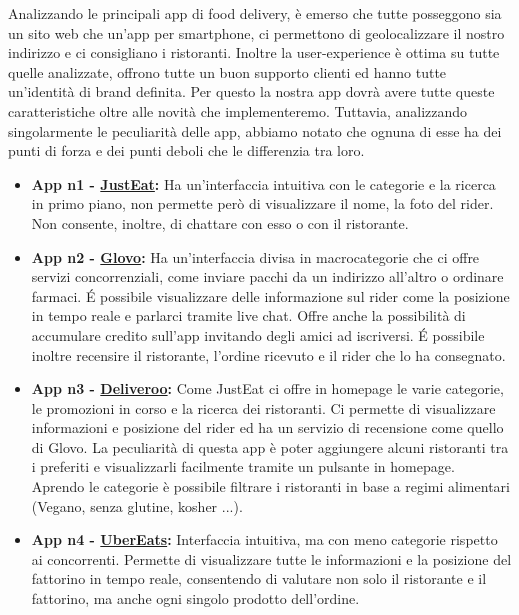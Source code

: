 \documentclass{article}
\begin{document}
     \par
    \newpage
    \vspace{0.5cm}
    Analizzando le principali app di food delivery, è emerso che tutte posseggono sia un sito web che un'app per smartphone, ci permettono di geolocalizzare il nostro indirizzo e ci consigliano i ristoranti. Inoltre la user-experience è ottima su tutte quelle analizzate, offrono tutte un buon supporto clienti ed hanno tutte un'identità di brand definita. Per questo la nostra app dovrà avere tutte queste caratteristiche oltre alle novità che implementeremo. Tuttavia, analizzando singolarmente le peculiarità delle app, abbiamo notato che ognuna di esse ha dei punti di forza e dei punti deboli che le differenzia tra loro.\vspace{0,7cm}
\begin{itemize}
        \item \textbf{App n1 - \href{https://www.justeat.it}{JustEat}:} Ha un’interfaccia intuitiva con le categorie e la ricerca in primo piano, non permette però di visualizzare il nome, la foto del rider. Non consente, inoltre, di chattare con esso o con il ristorante.\vspace{0.3cm}

        \item \textbf{App n2 - \href{https://glovoapp.com/it/it/}{Glovo}:} Ha un'interfaccia divisa in macrocategorie che ci offre servizi concorrenziali, come inviare pacchi da un indirizzo all’altro o ordinare farmaci. É possibile visualizzare delle informazione sul rider come la posizione in tempo reale e parlarci tramite live chat. Offre anche la possibilità di accumulare credito sull’app invitando degli amici ad iscriversi. É possibile inoltre recensire il ristorante, l’ordine ricevuto e il rider che lo ha consegnato.\vspace{0.3cm}

        \item \textbf{App n3 - \href{https://deliveroo.it/it/}{Deliveroo}:} Come JustEat ci offre in homepage le varie categorie, le promozioni in corso e la ricerca dei ristoranti. Ci permette di visualizzare informazioni e posizione del rider ed ha un servizio di recensione come quello di Glovo. La peculiarità di questa app è poter aggiungere alcuni ristoranti tra i preferiti e visualizzarli facilmente tramite un pulsante in homepage. Aprendo le categorie è possibile filtrare i ristoranti in base a regimi alimentari (Vegano, senza glutine, kosher ...).\vspace{0.3cm}

        \item \textbf{App n4 - \href{https://www.ubereats.com/it}{UberEats}:} Interfaccia intuitiva, ma con meno categorie rispetto ai concorrenti. Permette di visualizzare tutte le informazioni e la posizione del fattorino in tempo reale, consentendo di valutare non solo il ristorante e il fattorino, ma anche ogni singolo prodotto dell'ordine.\vspace{0.3cm}

    

\end{itemize}
\end{document}
